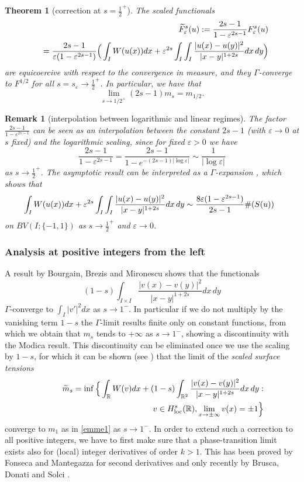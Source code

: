 \documentclass{article}
\newtheorem{remark}[lemma]{Remark}
\newtheorem{theorem}[lemma]{Theorem}
\newcommand{\e}{\varepsilon}
\begin{document}
\begin{theorem}[correction at $s=\frac12^+$]
The scaled functionals 
\begin{eqnarray}\nonumber&&
\hskip-1.1cm\widetilde F^s_\e(u):={\frac{2s-1}{1-\e^{2s-1}}} F^s_\e(u)\\
&&={\frac{2s-1}{\e(1-\e^{2s-1})}}\Big(\int_I W(u(x))dx +\e^{2s}\int_I\int_I \frac{|u(x)-u(y)|^2}{|x-y|^{1+2s}} dx\,dy\Big)
\end{eqnarray}
are equicoercive  with respect to the convergence in measure, and they
$\Gamma$-converge to $F^{1/2}$ for all $s=s_\e\to\frac12^+$. In particular, we have that
$$
\lim_{s\to1/2^+} (2s-1)m_s=m_{1/2}.
$$
\end{theorem}


\begin{remark}[interpolation between logarithmic and linear regimes]\rm The factor $\frac{2s-1}{1-\e^{2s-1}}$ can be seen as an interpolation between the constant
$2s-1$ (with $\e\to 0$ at $s$ fixed) and the logarithmic scaling, since for fixed $\e>0$ we have
$$
\frac{2s-1}{1-\e^{2s-1}}= \frac{2s-1}{1-e^{-(2s-1)|\log\e|}}\sim  \frac{1}{|\log\e|}
$$
as $s\to\frac12^+$. The asymptotic result can be interpreted as a $\Gamma$-expansion \cite{BT},
which shows that
$$\hskip-.2cm
\int_I W(u(x))dx +\e^{2s}\int_I\int_I \frac{|u(x)-u(y)|^2}{|x-y|^{1+2s}}dx\,dy\sim
\frac{8\e(1-\e^{2s-1})}{2s-1}\#(S(u))
$$
on $BV(I;\{-1,1\})$ as $s\to\frac12^+$ and $\e\to 0$.
\end{remark}

\subsubsection{Analysis at positive integers from the left}
A result by Bourgain, Brezis and Mironescu \cite{BBM} shows that the functionals 
$$
(1-s) \int_{I\times I}\frac{|v(x)-v(y)|^2}{|x-y|^{1+2s}}dx\,dy
$$
$\Gamma$-converge to $\int_I |v'|^2dx$ as $s\to 1^-$. In particular if we do not multiply by the vanishing term $1-s$ the $\Gamma$-limit results finite only on constant functions, from which we obtain that $m_s$ tends to $+\infty$ as $s\to 1^-$, showing a discontinuity with the Modica result. This discontinuity can be eliminated once we use the scaling by $1-s$, for which it can be shown (see \cite{Solci}) that the limit of the {\em scaled surface tensions} 
\begin{eqnarray}\label{emmetil1}\nonumber
&&\widetilde m_{s} =\inf\Big\{\int_{\mathbb R} W(v)dx+(1-s)\int_{\mathbb R^2}\frac{|v(x)-v(y)|^2}{|x-y|^{1+2s}} dx\,dy :\\
&& \hskip4.5cm v\in H^{s}_{\rm loc}(\mathbb R), \lim_{x\to\pm\infty}v(x)=\pm1\Big\}
\end{eqnarray}
converge to $m_1$ as in \eqref{emme1} as $s\to 1^-$. In order to extend such a correction to all positive integers, we have to first make sure that a phase-transition limit exists also for (local) integer derivatives of order $k>1$. This has been proved by Fonseca and Mantegazza \cite{FM} for second derivatives and only recently by Brusca, Donati and Solci \cite{BDS}.
\end{document}
